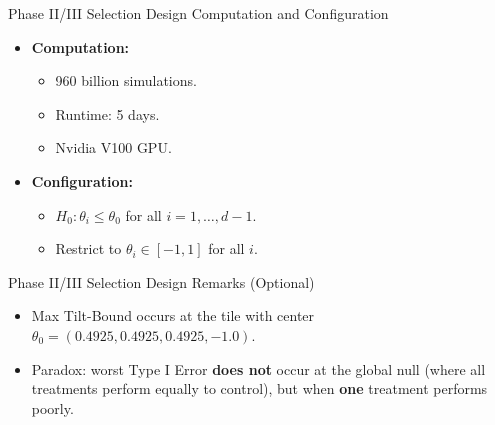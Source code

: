 \begin{frame}{Phase II/III Selection Design Computation and Configuration}
\begin{itemize}
    \item \textbf{Computation:}
    \begin{itemize}
        \item 960 billion simulations.
        \item Runtime: 5 days.
        \item Nvidia V100 GPU.
    \end{itemize}
    \item \textbf{Configuration:}
    \begin{itemize}
        \item $H_0: \theta_i \leq \theta_0$ for all $i=1,\ldots, d-1$.
        \item Restrict to $\theta_i \in [-1,1]$ for all $i$.
    \end{itemize}
\end{itemize}
\end{frame}

\begin{frame}{Phase II/III Selection Design Remarks (Optional)}
\begin{itemize}
    \item Max Tilt-Bound occurs at the tile with center
        $\theta_0 = (0.4925, 0.4925, 0.4925, -1.0)$. 
    \item Paradox: worst Type I Error \textbf{does not} 
        occur at the global null (where all treatments perform equally to control), but when \textbf{one} treatment performs poorly.
\end{itemize} 
\end{frame}